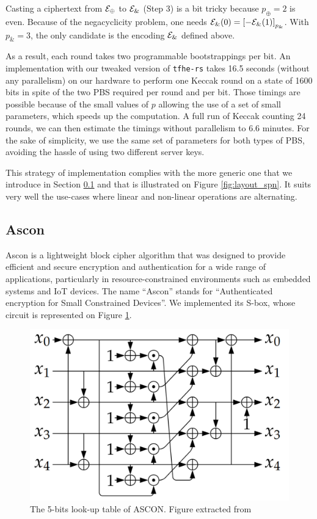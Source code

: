 Casting a ciphertext from $\mathcal{E}_\oplus$ to $\mathcal{E}_\&$ (Step 3) is a bit tricky because $p_\oplus = 2$ is even. Because of the negacyclicity problem, one needs $\mathcal{E}_\&(0) = \left [ -\mathcal{E}_\&(1) \right ]_{p_\&}$. With $p_\& = 3$, the only candidate is the encoding $\mathcal{E}_\&$ defined above.


As a result, each round takes two programmable bootstrappings per bit. An implementation with our tweaked version of \texttt{tfhe-rs} takes 16.5 seconds (without any parallelism) on our hardware to perform one Keccak round on a state of 1600 bits in spite of the two \gls{PBS} required per round and per bit. Those timings are possible because of the small values of $p$ allowing the use of a set of  small parameters, which speeds up the computation. A full run of Keccak counting 24 rounds, we can then estimate the timings without parallelism to $6.6$ minutes. For the sake of simplicity, we use the same set of parameters for both types of \gls{PBS}, avoiding the hassle of using two different server keys.


This strategy of implementation complies with the more generic one that we introduce in Section \ref{sec:ascon} and that is illustrated on Figure \ref{fig:layout_spn}. It suits very well the use-cases where linear and non-linear operations are alternating.


\subsection{Ascon}
\label{sec:ascon}


Ascon \cite{JC:DEMS21, asconv12nist} is a lightweight block cipher algorithm that was designed to provide efficient and secure encryption and authentication for a wide range of applications, particularly in resource-constrained environments such as embedded systems and IoT devices. The name ``Ascon'' stands for ``Authenticated encryption for Small Constrained Devices''. We implemented its S-box, whose circuit is represented on Figure \ref{fig:ascon}.

\begin{figure}[h]
    \centering
    \includegraphics[width=0.5\linewidth]{img/to_harmonize/ascon.png}
    \caption{The 5-bits look-up table of ASCON. Figure extracted from \cite{JC:DEMS21}}
    \label{fig:ascon}
\end{figure}



